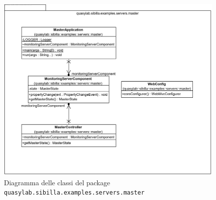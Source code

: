 \begin{figure}[H]
    \includegraphics[width=\linewidth]{images/quasylab.sibilla.examples.servers.master.png}
    \captionsetup{justification=centering}
    \caption{Diagramma delle classi del package \texttt{quasylab.sibilla.examples.servers.master}}
  \end{figure}

